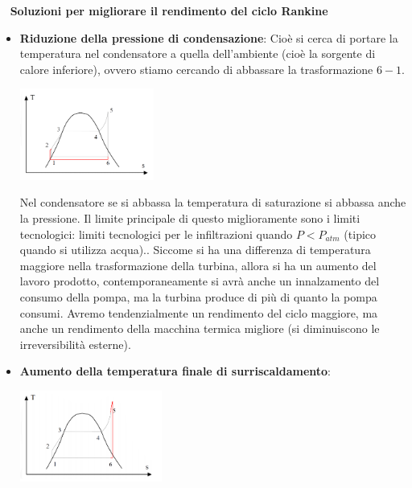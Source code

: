 \ \newline
\textbf{Soluzioni per migliorare il rendimento del ciclo Rankine}\newline
\begin{itemize}
    \item \textbf{Riduzione della pressione di condensazione}:\newline
    Cioè si cerca di portare la temperatura nel condensatore a quella dell'ambiente (cioè la sorgente di calore inferiore), ovvero stiamo cercando di abbassare la trasformazione $6-1$.
    \begin{center}
        \includegraphics[height=3cm]{../L08/img9.PNG}
    \end{center}
    Nel condensatore se si abbassa la temperatura di saturazione si abbassa anche la pressione.\newline
    \newline
    Il limite principale di questo miglioramente sono i limiti tecnologici: limiti tecnologici per le infiltrazioni quando $P < P_{atm}$ (tipico quando si utilizza acqua)..\newline
    \newline
    Siccome si ha una differenza di temperatura maggiore nella trasformazione della turbina, allora si ha un aumento del lavoro prodotto, contemporaneamente si avrà anche un innalzamento del consumo della pompa, ma la turbina produce di più di quanto la pompa consumi.\newline
    \newline
    Avremo tendenzialmente un rendimento del ciclo maggiore, ma anche un rendimento della macchina termica migliore (si diminuiscono le irreversibilità esterne).
    \item \textbf{Aumento della temperatura finale di surriscaldamento}:\newline
    \begin{center}
        \includegraphics[height=3cm]{../L08/img10.PNG}

\end{center}
\end{itemize}
